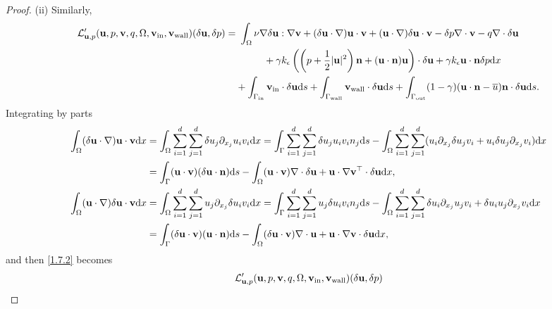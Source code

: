 \documentclass[oneside,11pt]{book}
\numberwithin{equation}{section}
\begin{document}
\begin{proof}
    (ii) Similarly,
    \begin{align}
        \mathcal{L}_{{\bf u},p}'({\bf u},p,{\bf v},q,\Omega,{\bf v}_{\rm in},{\bf v}_{\rm wall})(\delta{\bf u},\delta p) =&\ \int_\Omega \nu\nabla\delta{\bf u}:\nabla{\bf v} + (\delta{\bf u}\cdot\nabla){\bf u}\cdot{\bf v} + ({\bf u}\cdot\nabla)\delta{\bf u}\cdot{\bf v} - \delta p\nabla\cdot{\bf v} - q\nabla\cdot\delta{\bf u} \nonumber\\
        &\hspace{1cm} + \gamma k_\epsilon\left(\left(p + \frac{1}{2}|{\bf u}|^2\right){\bf n} + ({\bf u}\cdot{\bf n}){\bf u}\right)\cdot\delta{\bf u} + \gamma k_\epsilon{\bf u}\cdot{\bf n}\delta p{\rm d}x \nonumber\\
        &+ \int_{\Gamma_{\rm in}} {\bf v}_{\rm in}\cdot\delta{\bf u}{\rm d}s + \int_{\Gamma_{\rm wall}} {\bf v}_{\rm wall}\cdot\delta{\bf u}{\rm d}s + \int_{\Gamma_{\rm out}} (1 - \gamma)({\bf u}\cdot{\bf n} - \overline{u}){\bf n}\cdot\delta{\bf u}{\rm d}s.\label{1.7.2}
    \end{align}
    Integrating by parts
    \begin{align}
        \int_\Omega (\delta{\bf u}\cdot\nabla){\bf u}\cdot{\bf v}{\rm d}x &= \int_\Omega \sum_{i=1}^d\sum_{j=1}^d \delta u_j\partial_{x_j}u_iv_i{\rm d}x = \int_\Gamma \sum_{i=1}^d\sum_{j=1}^d \delta u_ju_iv_in_j{\rm d}s - \int_\Omega \sum_{i=1}^d\sum_{j=1}^d (u_i\partial_{x_j}\delta u_jv_i + u_i\delta u_j\partial_{x_j}v_i){\rm d}x\\
        &= \int_\Gamma ({\bf u}\cdot{\bf v})(\delta{\bf u}\cdot{\bf n}){\rm d}s - \int_\Omega ({\bf u}\cdot{\bf v})\nabla\cdot\delta{\bf u} + {\bf u}\cdot\nabla{\bf v}^\top\cdot\delta{\bf u}{\rm d}x,\\
        \int_\Omega ({\bf u}\cdot\nabla)\delta{\bf u}\cdot{\bf v}{\rm d}x &= \int_\Omega \sum_{i=1}^d\sum_{j=1}^d u_j\partial_{x_j}\delta u_iv_i{\rm d}x = \int_\Gamma \sum_{i=1}^d\sum_{j=1}^d u_j\delta u_iv_in_j{\rm d}s - \int_\Omega \sum_{i=1}^d\sum_{j=1}^d \delta u_i\partial_{x_j}u_jv_i + \delta u_iu_j\partial_{x_j}v_i{\rm d}x\\
        &= \int_\Gamma (\delta{\bf u}\cdot{\bf v})({\bf u}\cdot{\bf n}){\rm d}s - \int_\Omega (\delta{\bf u}\cdot{\bf v})\nabla\cdot{\bf u} + {\bf u}\cdot\nabla{\bf v}\cdot\delta{\bf u}{\rm d}x,
    \end{align}
    and then \eqref{1.7.2} becomes
    \begin{align}
        &\mathcal{L}_{{\bf u},p}'({\bf u},p,{\bf v},q,\Omega,{\bf v}_{\rm in},{\bf v}_{\rm wall})(\delta{\bf u},\delta p)\\

\end{align}
\end{proof}
\end{document}
